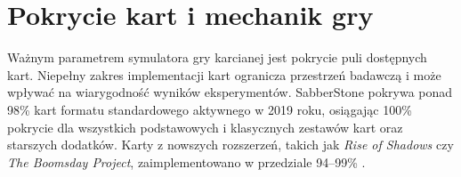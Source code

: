 \section{Pokrycie kart i mechanik gry}

Ważnym parametrem symulatora gry karcianej jest pokrycie puli dostępnych kart. Niepełny zakres implementacji kart ogranicza przestrzeń badawczą i może wpływać na wiarygodność wyników eksperymentów. SabberStone pokrywa ponad 98\% kart formatu standardowego aktywnego w 2019 roku, osiągając 100\% pokrycie dla wszystkich podstawowych i klasycznych zestawów kart oraz starszych dodatków. Karty z nowszych rozszerzeń, takich jak \textit{Rise of Shadows} czy \textit{The Boomsday Project}, zaimplementowano w przedziale 94--99\% \cite{sabberstone_github}.

